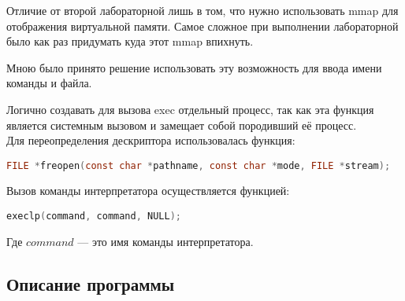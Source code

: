 \documentclass[12pt]{article}
\begin{document}
Отличие от второй лабораторной лишь в том, что нужно использовать mmap для отображения виртуальной памяти. 
Самое сложное при выполнении лабораторной было как раз придумать куда этот mmap впихнуть.

Мною было принято решение использовать эту возможность для ввода имени команды и файла.

Логично создавать для вызова exec отдельный процесс, так как эта функция является системным вызовом и замещает собой породивший её процесс.
\\
Для переопределения дескриптора использовалась функция:

\lstinline[language=c]|FILE *freopen(const char *pathname, const char *mode, FILE *stream);|

\noindent Вызов команды интерпретатора осуществляется функцией:

\lstinline[language=c]|execlp(command, command, NULL);|

Где $command$ --- это имя команды интерпретатора.

\subsection*{Описание программы}
\end{document}
